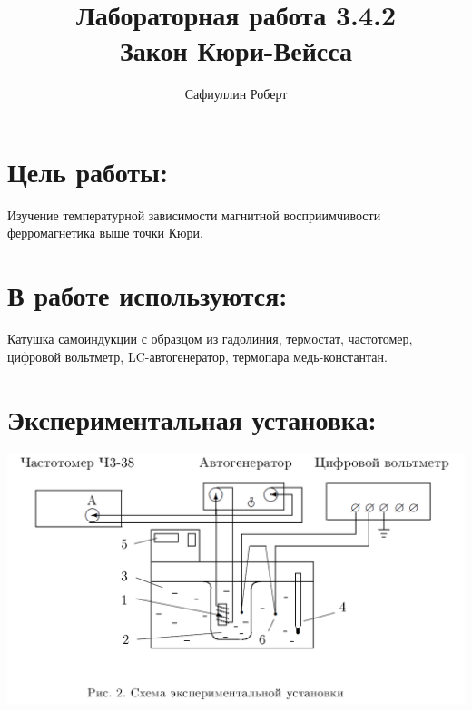 \documentclass[a4paper,12pt]{article} %
\author{Сафиуллин Роберт	}
\title{Лабораторная работа 3.4.2\\ Закон Кюри-Вейсса}
\begin{document}

\maketitle


\newpage
\section{Цель работы:}
  Изучение температурной зависимости магнитной восприимчивости ферромагнетика выше точки Кюри.\\
\section{В работе используются:}
Катушка самоиндукции с образцом из гадолиния, термостат, частотомер, цифровой вольтметр, LC-автогенератор, термопара медь-константан.

 
\section{Экспериментальная установка:}

 \includegraphics[scale=0.6]{ust}
\end{document}
